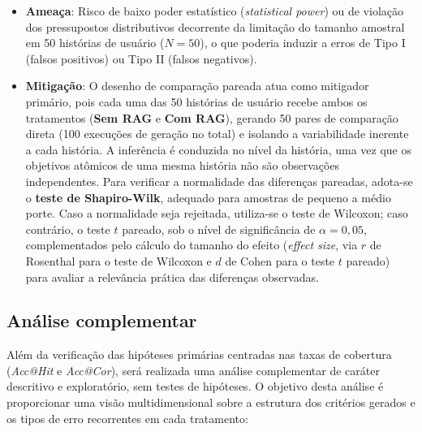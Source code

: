 \begin{itemize}
    \item \textbf{Ameaça}: Risco de baixo poder estatístico (\textit{statistical power}) ou de violação dos pressupostos distributivos decorrente da limitação do tamanho amostral em 50 histórias de usuário ($N = 50$), o que poderia induzir a erros de Tipo I (falsos positivos) ou Tipo II (falsos negativos).

    \item \textbf{Mitigação}: O desenho de comparação pareada atua como mitigador primário, pois cada uma das 50 histórias de usuário recebe ambos os tratamentos (\textbf{Sem RAG} e \textbf{Com RAG}), gerando 50 pares de comparação direta (100 execuções de geração no total) e isolando a variabilidade inerente a cada história. A inferência é conduzida no nível da história, uma vez que os objetivos atômicos de uma mesma história não são observações independentes. Para verificar a normalidade das diferenças pareadas, adota-se o \textbf{teste de Shapiro-Wilk}, adequado para amostras de pequeno a médio porte. Caso a normalidade seja rejeitada, utiliza-se o teste de Wilcoxon; caso contrário, o teste $t$ pareado, sob o nível de significância de $\alpha = 0{,}05$, complementados pelo cálculo do tamanho do efeito (\textit{effect size}, via $r$ de Rosenthal para o teste de Wilcoxon e $d$ de Cohen para o teste $t$ pareado) para avaliar a relevância prática das diferenças observadas.
\end{itemize}

\subsection{Análise complementar}
\label{sec:analise-complementar}

Além da verificação das hipóteses primárias centradas nas taxas de cobertura (\textit{Acc@Hit} e \textit{Acc@Cor}), será realizada uma análise complementar de caráter descritivo e exploratório, sem testes de hipóteses. O objetivo desta análise é proporcionar uma visão multidimensional sobre a estrutura dos critérios gerados e os tipos de erro recorrentes em cada tratamento:

